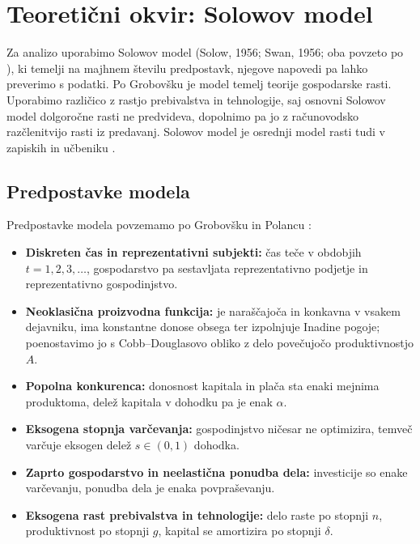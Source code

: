 \documentclass[12pt,a4paper]{article}
\begin{document}
\section{Teoretični okvir: Solowov model}\label{sec:teorija}
Za analizo uporabimo Solowov model (Solow, 1956; Swan, 1956; oba povzeto po \cite[pros.~12]{grobovsek2026}), ki temelji na majhnem številu predpostavk, njegove napovedi pa lahko preverimo s podatki. Po Grobovšku \parencite*[pros.~39, 51 in~64--81]{grobovsek2026} je model temelj teorije gospodarske rasti. Uporabimo različico z rastjo prebivalstva in tehnologije, saj osnovni Solowov model dolgoročne rasti ne predvideva, dopolnimo pa jo z računovodsko razčlenitvijo rasti iz predavanj. Solowov model je osrednji model rasti tudi v zapiskih in učbeniku \parencites[str.~9--18]{polanec_rast}[pogl.~5--6]{garin2021}.

\subsection{Predpostavke modela}\label{sec:predpostavke}
Predpostavke modela povzemamo po Grobovšku \parencite*[pros.~15--21 in~52]{grobovsek2026} in Polancu \parencite*[str.~9--12]{polanec_rast}:
\begin{itemize}
    \item \textbf{Diskreten čas in reprezentativni subjekti:} čas teče v obdobjih $t=1,2,3,\ldots$, gospodarstvo pa sestavljata reprezentativno podjetje in reprezentativno gospodinjstvo.
    \item \textbf{Neoklasična proizvodna funkcija:} je naraščajoča in konkavna v vsakem dejavniku, ima konstantne donose obsega ter izpolnjuje Inadine pogoje; poenostavimo jo s Cobb--Douglasovo obliko z delo povečujočo produktivnostjo $A$.
    \item \textbf{Popolna konkurenca:} donosnost kapitala in plača sta enaki mejnima produktoma, delež kapitala v dohodku pa je enak $\alpha$.
    \item \textbf{Eksogena stopnja varčevanja:} gospodinjstvo ničesar ne optimizira, temveč varčuje eksogen delež $s\in(0,1)$ dohodka.
    \item \textbf{Zaprto gospodarstvo in neelastična ponudba dela:} investicije so enake varčevanju, ponudba dela je enaka povpraševanju.
    \item \textbf{Eksogena rast prebivalstva in tehnologije:} delo raste po stopnji $n$, produktivnost po stopnji $g$, kapital se amortizira po stopnji $\delta$.
\end{itemize}
\end{document}

